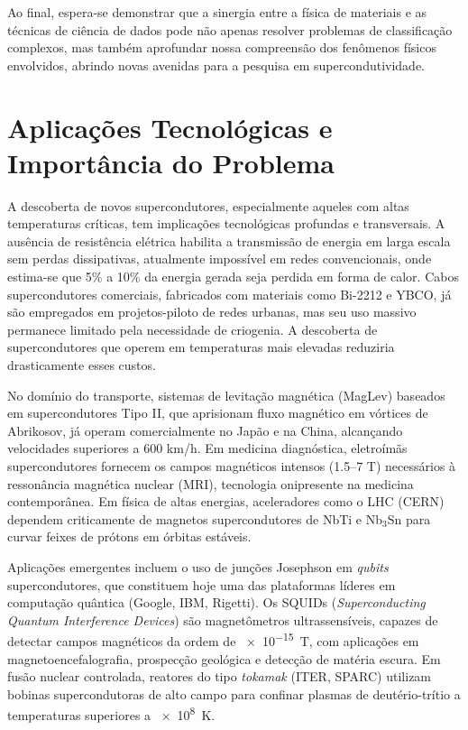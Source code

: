 \documentclass[12pt, a4paper, oneside]{report}
\begin{document}
Ao final, espera-se demonstrar que a sinergia entre a física de materiais e as técnicas de ciência de dados pode não apenas resolver problemas de classificação complexos, mas também aprofundar nossa compreensão dos fenômenos físicos envolvidos, abrindo novas avenidas para a pesquisa em supercondutividade.

\section{Aplicações Tecnológicas e Importância do Problema}

A descoberta de novos supercondutores, especialmente aqueles com altas temperaturas críticas, tem implicações tecnológicas profundas e transversais. A ausência de resistência elétrica habilita a transmissão de energia em larga escala sem perdas dissipativas, atualmente impossível em redes convencionais, onde estima-se que 5\% a 10\% da energia gerada seja perdida em forma de calor. Cabos supercondutores comerciais, fabricados com materiais como Bi-2212 e YBCO, já são empregados em projetos-piloto de redes urbanas, mas seu uso massivo permanece limitado pela necessidade de criogenia. A descoberta de supercondutores que operem em temperaturas mais elevadas reduziria drasticamente esses custos.

No domínio do transporte, sistemas de levitação magnética (MagLev) baseados em supercondutores Tipo II, que aprisionam fluxo magnético em vórtices de Abrikosov, já operam comercialmente no Japão e na China, alcançando velocidades superiores a 600 km/h. Em medicina diagnóstica, eletroímãs supercondutores fornecem os campos magnéticos intensos (1.5--7 T) necessários à ressonância magnética nuclear (MRI), tecnologia onipresente na medicina contemporânea. Em física de altas energias, aceleradores como o LHC (CERN) dependem criticamente de magnetos supercondutores de NbTi e Nb$_3$Sn para curvar feixes de prótons em órbitas estáveis.

Aplicações emergentes incluem o uso de junções Josephson em \textit{qubits} supercondutores, que constituem hoje uma das plataformas líderes em computação quântica (Google, IBM, Rigetti). Os SQUIDs (\textit{Superconducting Quantum Interference Devices}) são magnetômetros ultrassensíveis, capazes de detectar campos magnéticos da ordem de \SI{e-15}{\tesla}, com aplicações em magnetoencefalografia, prospecção geológica e detecção de matéria escura. Em fusão nuclear controlada, reatores do tipo \textit{tokamak} (ITER, SPARC) utilizam bobinas supercondutoras de alto campo para confinar plasmas de deutério-trítio a temperaturas superiores a \SI{e8}{\kelvin}.
\end{document}
